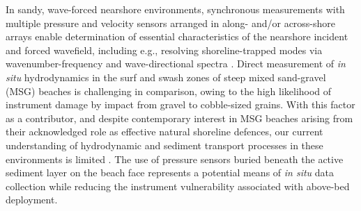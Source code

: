 In sandy, wave-forced nearshore environments, synchronous measurements with multiple pressure and velocity sensors arranged in along- and/or across-shore arrays enable determination of essential characteristics of the nearshore incident and forced wavefield, including e.g., resolving shoreline-trapped modes via wavenumber-frequency and wave-directional spectra \citep[e.g.,][]{Huntley_etal1981, OltmanShay_Guza1987}. Direct measurement of \textit{in situ} hydrodynamics in the surf and swash zones of steep mixed sand-gravel (MSG) beaches is challenging in comparison, owing to the high likelihood of instrument damage by impact from gravel to cobble-sized grains. With this factor as a contributor, and despite contemporary interest in MSG beaches arising from their acknowledged role as effective natural shoreline defences, our current understanding of hydrodynamic and sediment transport processes in these environments is limited \citep{Mason_Coates2001, Osborne2005}. The use of pressure sensors buried beneath the active sediment layer on the beach face represents a potential means of \textit{in situ} data collection while reducing the instrument vulnerability associated with above-bed deployment.

